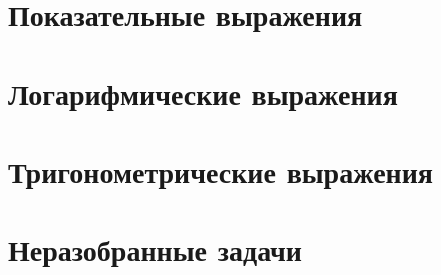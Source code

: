 \documentclass[10pt, a4paper]{article}
\begin{document}
\section{Показательные выражения}
\section{Логарифмические выражения}
\section{Тригонометрические выражения}
\section{Неразобранные задачи}	
\end{document}
